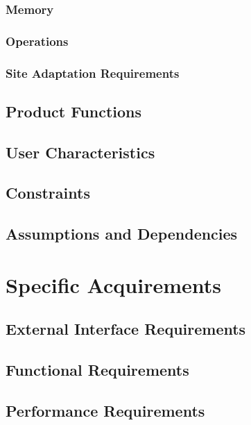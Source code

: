 \documentclass[a4paper,10pt]{article}
\begin{document}
		\subsubsection{Memory}
		\subsubsection{Operations}
		\subsubsection{Site Adaptation Requirements}
		
	\subsection{Product Functions}
	\subsection{User Characteristics}
	\subsection{Constraints}
	\subsection{Assumptions and Dependencies}

\section{Specific Acquirements}

	\subsection{External Interface Requirements}
	\subsection{Functional Requirements}
	\subsection{Performance Requirements}
\end{document}
